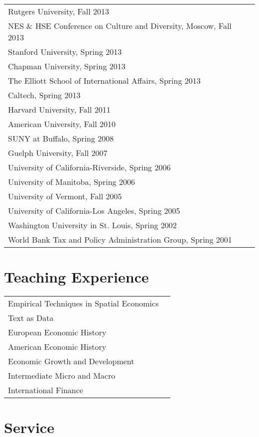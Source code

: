 \documentclass[11pt,fullpage]{article}
\begin{document}
\begin{tabular}{ll}
	Rutgers University, Fall 2013 \\
	NES \& HSE Conference on Culture and Diversity, Moscow, Fall 2013 \\
	Stanford University, Spring 2013 \\
	Chapman University, Spring 2013 \\
	The Elliott School of International Affairs, Spring 2013 \\
	Caltech, Spring 2013 \\
	Harvard University, Fall 2011 \\
	American University, Fall 2010 \\
	SUNY at Buffalo, Spring 2008 \\
	Guelph University, Fall 2007 \\
	University of California-Riverside, Spring 2006 \\
	University of Manitoba, Spring 2006 \\
	University of Vermont, Fall 2005 \\
	University of California-Los Angeles, Spring 2005 \\
	Washington University in St. Louis, Spring 2002 \\
	World Bank Tax and Policy Administration Group, Spring 2001 \\
\end{tabular}


\section*{Teaching Experience}

\begin{tabular}{ll}
	Empirical Techniques in Spatial Economics \\
	Text as Data \\
	European Economic History  \\
	American Economic History  \\ 
	Economic Growth and Development \\
	Intermediate Micro and Macro \\
	International Finance \\
\end{tabular}


\section*{Service}
\end{document}
